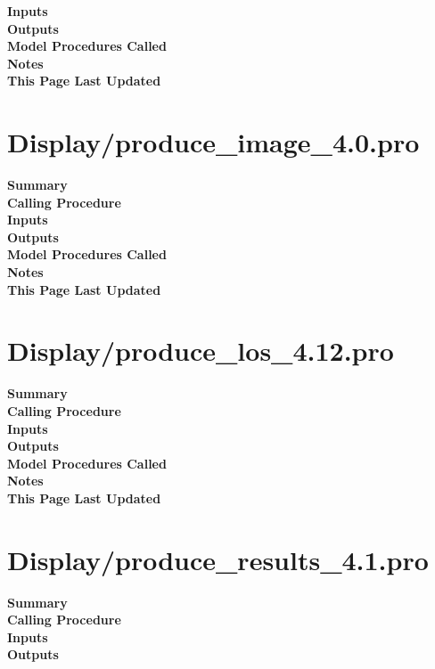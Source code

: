 \documentclass[11pt]{article}
\newcommand\descrip[1]{\textsf{\textbf{\large{#1}}}\\}
\begin{document}
\descrip{Inputs}

\descrip{Outputs}

\descrip{Model Procedures Called}

\descrip{Notes}

\descrip{This Page Last Updated}

\clearpage

\section{Display/produce\_image\_4.0.pro} \label{sec:produce_image}

\descrip{Summary}

\descrip{Calling Procedure}

\descrip{Inputs}

\descrip{Outputs}

\descrip{Model Procedures Called}

\descrip{Notes}

\descrip{This Page Last Updated}

\clearpage

\section{Display/produce\_los\_4.12.pro} \label{sec:produce_los}

\descrip{Summary}

\descrip{Calling Procedure}

\descrip{Inputs}

\descrip{Outputs}

\descrip{Model Procedures Called}

\descrip{Notes}

\descrip{This Page Last Updated}

\clearpage

\section{Display/produce\_results\_4.1.pro} \label{sec:produce_results}

\descrip{Summary}

\descrip{Calling Procedure}

\descrip{Inputs}

\descrip{Outputs}
\end{document}
